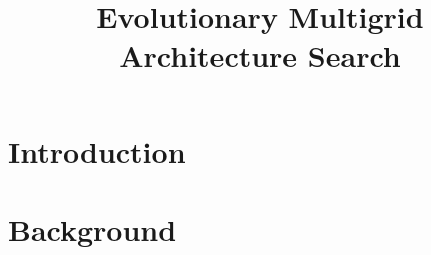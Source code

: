 \documentclass[
  paper = 17x24,
  language = english,
  acronym = split,
  acronymline = novertical,
  bibliography = false,
  bibliographypart = false,
  titlesize = Huge,
  par = halfskip,
]{faupress}
\title{Evolutionary Multigrid Architecture Search}
\institute{Lehrstuhl für Informatik 10}
\theoremstyle{definition}
\begin{document}
\maketitle

\frontmatter
  
  \makefacultytitle

  \begin{preface}
   
    
  \end{preface}

  \tableofcontents

  \faupressprintacronyms
  
  \listoffigures
  
  \listoftables

\mainmatter

\chapter{Introduction}
    

\chapter{Background}
  
  
  
  

\appendix 
  
    
\backmatter
  
  
\end{document}
